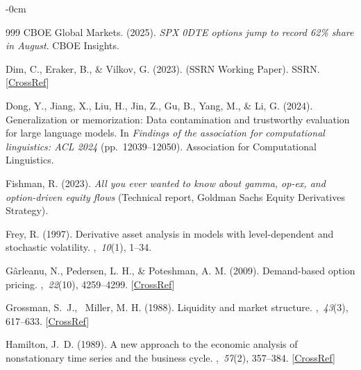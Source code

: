 \documentclass[jrfm,article,accept,moreauthors,pdftex]{Definitions/mdpi}
\begin{document}
\begin{adjustwidth}{-\extralength}{0cm}
\begin{thebibliography}{999}
{CBOE Global Markets}. (2025).
\newblock \textit{{SPX} 0{DTE} options jump to record 62\% share in August}.
\newblock CBOE Insights.

Dim, C., Eraker, B., \& Vilkov, G. (2023).
 (SSRN Working Paper).
  SSRN.
 [\href{http://dx.doi.org/10.2139/ssrn.4692190}{CrossRef}]

Dong, Y., Jiang, X., Liu, H., Jin, Z., Gu, B., Yang, M., \& Li, G.
(2024).
\newblock Generalization or memorization: Data contamination and trustworthy
evaluation for large language models.
\newblock In {\em Findings of the association for computational linguistics:
ACL 2024} (pp.~12039--12050). Association for
Computational Linguistics.

Fishman, R. (2023).
\newblock \textit{All you ever wanted to know about gamma, op-ex, and option-driven
equity flows} (Technical report, Goldman Sachs Equity Derivatives Strategy).

Frey, R. (1997).
\newblock Derivative asset analysis in models with level-dependent and
stochastic volatility.
,~{\em 10\/}(1), 1--34.

G\^{a}rleanu, N., Pedersen, L. H., \& Poteshman, A. M. (2009).
\newblock Demand-based option pricing.
,~{\em 22\/}(10), 4259--4299. [\href{http://dx.doi.org/10.1093/rfs/hhp005}{CrossRef}]

Grossman, S.~J., \BBA\ Miller, M. H. (1988).
\newblock Liquidity and market structure.
,~{\em 43\/}(3), 617--633. [\href{http://dx.doi.org/10.1111/j.1540-6261.1988.tb04594.x}{CrossRef}]

Hamilton, J.~D. (1989).
\newblock A new approach to the economic analysis of nonstationary time series
and the business cycle.
,~{\em 57\/}(2), 357--384. [\href{http://dx.doi.org/10.2307/1912559}{CrossRef}]


\end{thebibliography}
\end{adjustwidth}
\end{document}
